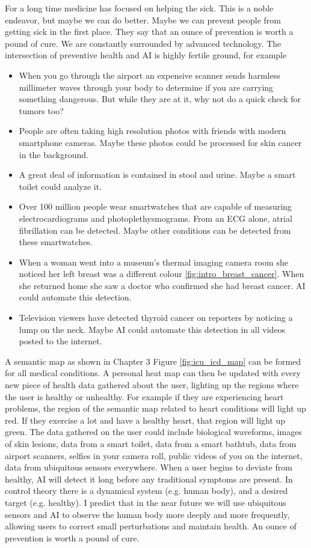 For a long time medicine has focused on helping the sick.  This is a noble endeavor, but maybe we can do better.  Maybe we can prevent people from getting sick in the first place.  They say that an ounce of prevention is worth a pound of cure.  We are constantly surrounded by advanced technology.  The intersection of preventive health and AI is highly fertile ground, for example

\begin{itemize}
    \item When you go through the airport an expensive scanner sends harmless millimeter waves through your body to determine if you are carrying something dangerous.  But while they are at it, why not do a quick check for tumors too?
    \item People are often taking high resolution photos with friends with modern smartphone cameras.  Maybe these photos could be processed for skin cancer in the background.
    \item A great deal of information is contained in stool and urine.  Maybe a smart toilet could analyze it.
    \item Over 100 million people wear smartwatches that are capable of measuring electrocardiograms and photoplethysmograms.  From an ECG alone, atrial fibrillation can be detected.  Maybe other conditions can be detected from these smartwatches.
    \item When a woman went into a museum's thermal imaging camera room she noticed her left breast was a different colour \ref{fig:intro_breast_cancer}. When she returned home she saw a doctor who confirmed she had breast cancer.  AI could automate this detection.
    \item Television viewers have detected thyroid cancer on reporters by noticing a lump on the neck.  Maybe AI could automate this detection in all videos posted to the internet.
\end{itemize}

A semantic map as shown in Chapter 3 Figure \ref{fig:icu_icd_map} can be formed for all medical conditions.  A personal heat map can then be updated with every new piece of health data gathered about the user, lighting up the regions where the user is healthy or unhealthy.  For example if they are experiencing heart problems, the region of the semantic map related to heart conditions will light up red.  If they exercise a lot and have a healthy heart, that region will light up green.  The data gathered on the user could include biological waveforms, images of skin lesions, data from a smart toilet, data from a smart bathtub, data from airport scanners, selfies in your camera roll, public videos of you on the internet, data from ubiquitous sensors everywhere.  When a user begins to deviate from healthy, AI will detect it long before any traditional symptoms are present.  In control theory there is a dynamical system (e.g. human body), and a desired target (e.g. healthy). I predict that in the near future we will use ubiquitous sensors and AI to observe the human body more deeply and more frequently, allowing users to correct small perturbations and maintain health.  An ounce of prevention is worth a pound of cure.